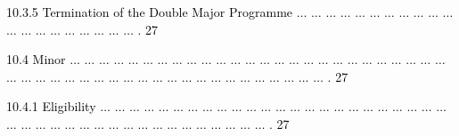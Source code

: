 \documentclass[12pt]{article}
\begin{document}
\vspace{\baselineskip}
\begin{adjustwidth}{0.5in}{0.0in}
{\fontsize{7pt}{8.4pt}\selectfont \textcolor[HTML]{00000A}{10.3.5 Termination of the Double Major Programme $ \ldots $ $ \ldots $ $ \ldots $ $ \ldots $ $ \ldots $ $ \ldots $ $ \ldots $ $ \ldots $ $ \ldots $ $ \ldots $ $ \ldots $ $ \ldots $ $ \ldots $ $ \ldots $ $ \ldots $ $ \ldots $ $ \ldots $ $ \ldots $ $ \ldots $ $ \ldots $ . 27}\par}\par

\end{adjustwidth}


\vspace{\baselineskip}
\begin{adjustwidth}{0.21in}{0.0in}
{\fontsize{7pt}{8.4pt}\selectfont \textcolor[HTML]{00000A}{10.4 Minor $ \ldots $ $ \ldots $ $ \ldots $ $ \ldots $ $ \ldots $ $ \ldots $ $ \ldots $ $ \ldots $ $ \ldots $ $ \ldots $ $ \ldots $ $ \ldots $ $ \ldots $ $ \ldots $ $ \ldots $ $ \ldots $ $ \ldots $ $ \ldots $ $ \ldots $ $ \ldots $ $ \ldots $ $ \ldots $ $ \ldots $ $ \ldots $ $ \ldots $ $ \ldots $ $ \ldots $ $ \ldots $ $ \ldots $ $ \ldots $ $ \ldots $ $ \ldots $ $ \ldots $ $ \ldots $ $ \ldots $ $ \ldots $ $ \ldots $ $ \ldots $ $ \ldots $ $ \ldots $ $ \ldots $ $ \ldots $ $ \ldots $ $ \ldots $ $ \ldots $ $ \ldots $ $ \ldots $ $ \ldots $ . 27}\par}\par

\end{adjustwidth}


\vspace{\baselineskip}
\begin{adjustwidth}{0.5in}{0.0in}
{\fontsize{7pt}{8.4pt}\selectfont \textcolor[HTML]{00000A}{10.4.1 Eligibility $ \ldots $ $ \ldots $ $ \ldots $ $ \ldots $ $ \ldots $ $ \ldots $ $ \ldots $ $ \ldots $ $ \ldots $ $ \ldots $ $ \ldots $ $ \ldots $ $ \ldots $ $ \ldots $ $ \ldots $ $ \ldots $ $ \ldots $ $ \ldots $ $ \ldots $ $ \ldots $ $ \ldots $ $ \ldots $ $ \ldots $ $ \ldots $ $ \ldots $ $ \ldots $ $ \ldots $ $ \ldots $ $ \ldots $ $ \ldots $ $ \ldots $ $ \ldots $ $ \ldots $ $ \ldots $ $ \ldots $ $ \ldots $ $ \ldots $ $ \ldots $ $ \ldots $ $ \ldots $ $ \ldots $ $ \ldots $ . 27}\par}\par

\end{adjustwidth}
\end{document}
